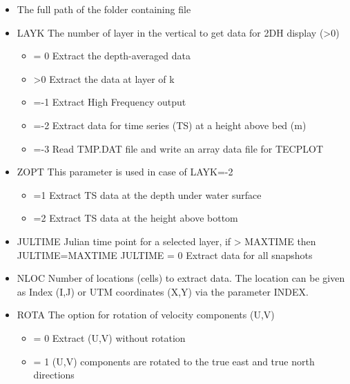\documentclass[letterpaper,10pt,english]{sphinxmanual}
\begin{document}
\begin{itemize}
\item {} 
The full path of the folder containing  file

\item {} 
LAYK The number of layer in the vertical to get data for 2DH display (\textgreater{}0)
\begin{itemize}
\item {} 
= 0 Extract the depth-averaged data

\item {} 
\textgreater{}0 Extract the data at layer of k

\item {} 
=-1 Extract High Frequency output

\item {} 
=-2 Extract data for time series (TS) at a height above bed (m)

\item {} 
=-3 Read TMP.DAT file and write an array data file for TECPLOT

\end{itemize}

\item {} 
ZOPT This parameter is used in case of LAYK=-2
\begin{itemize}
\item {} 
=1 Extract TS data at the depth under water surface

\item {} 
=2 Extract TS data at the height above bottom

\end{itemize}

\item {} 
JULTIME Julian time point for a selected layer, if \textgreater{} MAXTIME then JULTIME=MAXTIME
JULTIME = 0 Extract data for all snapshots

\item {} 
NLOC Number of locations (cells) to extract data. The location can be given
as Index (I,J) or UTM coordinates (X,Y) via the parameter INDEX.

\item {} 
ROTA The option for rotation of velocity components (U,V)
\begin{itemize}
\item {} 
= 0  Extract (U,V) without rotation

\item {} 
= 1  (U,V) components are rotated to the true east and true north directions


\end{itemize}
\end{itemize}
\end{document}
